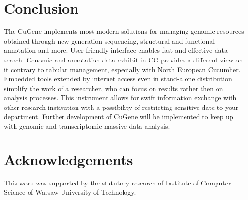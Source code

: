 \documentclass[a4paper]{spie}
\newcommand{\appName}{CuGene}
\newcommand{\appShortcut}{CG}
\begin{document}
\section{Conclusion}

The \appName{} implements most modern solutions for managing genomic resources obtained through new generation sequencing,
structural and functional annotation and more.
User friendly interface enables fast and effective data search.
Genomic and annotation data exhibit in \appShortcut{} provides a different view on it contrary to tabular management, especially with North European Cucumber.
Embedded tools extended by internet access even in stand-alone distribution simplify the work of a researcher,
who can focus on results rather then on analysis processes.
This instrument allows for swift information exchange with other research institution with a possibility of restricting sensitive date to your department.
Further development of \appName{} will be implemented to keep up with genomic and transcriptomic massive data analysis.

\section*{Acknowledgements}

This work was supported by the statutory research of Institute of Computer Science of Warsaw University of Technology.



\end{document}
